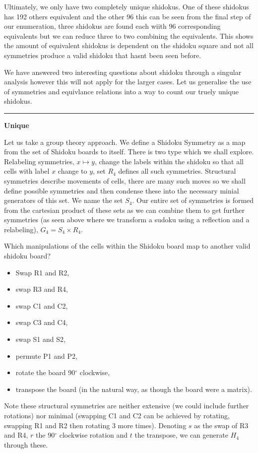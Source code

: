 \documentclass[a4paper,11pt]{report}
\begin{document}
Ultimately, we only have two completely unique shidokus. One of these shidokus has 192 others equivalent and the other 96 this can be seen from the final step of our enumeration, three shidokus are found each wiith 96 corresponding equivalents but we can reduce three to two combining the equivalents. This shows the amount of equivalent shidokus is dependent on the shidoku square and not all symmetries produce a valid shidoku that hasnt been seen before.

We have answered two interesting questions about shidoku through a singular analysis however this will not apply for the larger cases. Let us generalise the use of symmetries and equivlance relations into a way to count our truely unique shidokus.

\noindent\rule{4cm}{0.4pt}

\textbf{Unique}

Let us take a group theory approach. We define a Shidoku Symmetry as a map from the set of Shidoku boards to itself. There is two type which we shall explore. Relabeling symmetries, $x\mapsto y$, change the labels within the shidoku so that all cells with label $x$ change to $y$, set $R_4$ defines all such symmetries. Structural symmetries describe movements of cells, there are many such moves so we shall define possible symmetries and then condense these into the necessary minial generators of this set. We name the set $S_4$. Our entire set of symmetries is formed from the cartesian product of these sets as we can combine them to get further symmetries (as seen above where we transform a sudoku using a reflection and a relabeling), $G_4=S_4\times R_4$.

Which manipulations of the cells within the Shidoku board map to another valid shidoku board? 
\begin{itemize}
\item Swap R1 and R2,
\item swap R3 and R4,
\item swap C1 and C2,
\item swap C3 and C4,
\item swap S1 and S2,
\item permute P1 and P2,
\item rotate the board 90$^\circ$ clockwise,
\item transpose the board (in the natural way, as though the board were a matrix).
\end{itemize}
Note these structural symmetries are neither extensive (we could include further rotations) nor minimal (swapping C1 and C2 can be achieved by rotating, swapping R1 and R2 then rotating 3 more times). Denoting $s$ as the swap of R3 and R4, $r$ the 90$^\circ$ clockwise rotation and $t$ the transpose, we can generate $H_4$ through these.
\end{document}
